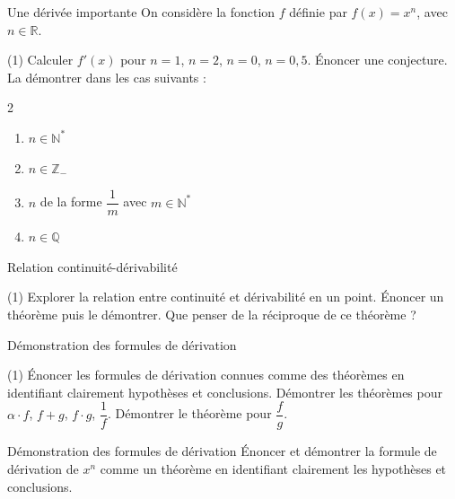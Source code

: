 \documentclass[a4paper,12pt]{article}
\begin{document}
\begin{activite}{Une dérivée importante}
\tcblower
On considère la fonction \(f\) définie par \(f(x)=x^n\), avec \(n\in\mathbb{R}\).
\begin{tasks}(1)
  \task Calculer \(f'(x)\) pour \(n=1\), \(n=2\), \(n=0\), \(n=0,5\).
  \task Énoncer une conjecture.
  \task* La démontrer dans les cas suivants :
  \begin{multicols}{2}
    \begin{enumerate}
      \item \(n\in\mathbb{N}^*\)
      \item \(n\in\mathbb{Z}_-\)
      \item \(n\) de la forme \(\dfrac{1}{m}\) avec \(m\in\mathbb{N}^*\)
      \item \(n\in\mathbb{Q}\)
    \end{enumerate}
  \end{multicols}
\end{tasks}
\end{activite}

\begin{activite}{Relation continuité-dérivabilité}
\tcblower
\begin{tasks}(1)
\task Explorer la relation entre continuité et dérivabilité en un point.
\task Énoncer un théorème puis le démontrer.
\task Que penser de la réciproque de ce théorème ?
\end{tasks}
\end{activite}
\begin{activite}{Démonstration des formules de dérivation}
\tcblower
\begin{tasks}(1)
\task Énoncer les formules de dérivation connues comme des théorèmes en identifiant clairement hypothèses et conclusions.
\task Démontrer les théorèmes pour $\alpha \cdot f$, $f + g$, $f \cdot g$, $\dfrac{1}{f}$.
\task Démontrer le théorème pour $\dfrac{f}{g}$.
\end{tasks}
\end{activite}
\begin{activite}
	Démonstration des formules de dérivation
	\tcblower
	Énoncer et démontrer la formule de dérivation de $x^n$ comme un théorème en identifiant clairement les hypothèses et conclusions.
\end{activite}
\end{document}
